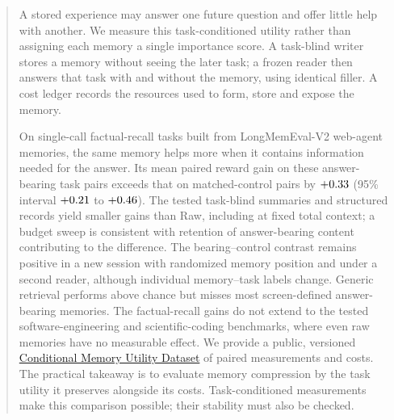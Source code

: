 \begin{abstract}
A stored experience may answer one future question and offer little help
with another. We measure this task-conditioned utility rather than assigning
each memory a single importance score. A task-blind writer stores a memory
without seeing the later task; a frozen reader then answers that task with
and without the memory, using identical filler. A cost ledger records the
resources used to form, store and expose the memory.

On single-call factual-recall tasks built from LongMemEval-V2 web-agent
memories, the same memory helps more when it contains information needed for
the answer. Its mean paired reward gain on these answer-bearing task pairs
exceeds that on matched-control pairs by $\lfHeadD$ (95\% interval
$\lfHeadLo$ to $\lfHeadHi$). The tested task-blind summaries and structured records yield smaller gains
than Raw, including at fixed total context; a budget sweep is consistent
with retention of answer-bearing content contributing to the difference.
The bearing--control contrast remains positive in a new session with
randomized memory position and under a second reader, although individual
memory--task labels change. Generic retrieval performs above
chance but misses most screen-defined answer-bearing memories. The factual-recall gains do not extend to the tested software-engineering
and scientific-coding benchmarks, where even raw memories have no measurable
effect. We provide a public, versioned
\href{https://huggingface.co/datasets/AgentsSci/AAMAS2027-ConditionalMemory}{Conditional Memory Utility Dataset}
of paired measurements and costs. The practical takeaway is to evaluate memory compression by the task
utility it preserves alongside its costs. Task-conditioned measurements
make this comparison possible; their stability must also be checked.
\end{abstract}

